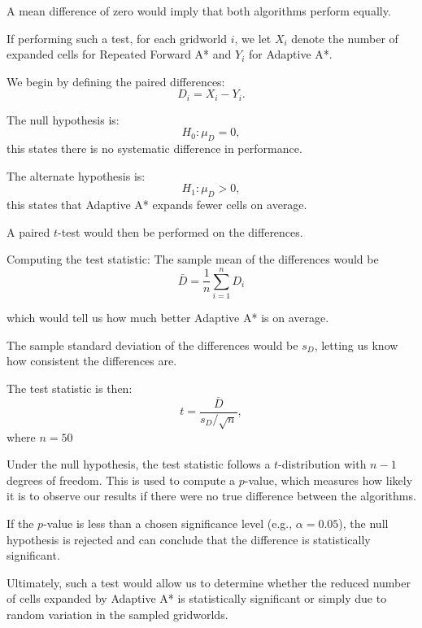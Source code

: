 \documentclass{article}
\begin{document}
A mean difference of zero would imply that both algorithms perform equally.

If performing such a test, for each gridworld $i$, we let $X_i$ denote the number of expanded cells for Repeated Forward A* and $Y_i$ for Adaptive A*.

We begin by defining the paired differences: 
\[
D_i = X_i - Y_i.
\]

The null hypothesis is:
\[
H_0: \mu_D = 0,
\]
this states there is no systematic difference in performance.

The alternate hypothesis is:
\[
H_1: \mu_D > 0,
\]
this states that Adaptive A* expands fewer cells on average.

A paired $t$-test would then be performed on the differences.

Computing the test statistic:
The sample mean of the differences would be
  \[
  \bar{D} = \frac{1}{n} \sum_{i=1}^{n} D_i
  \]

which would tell us how much better Adaptive A* is on average. 

The sample standard deviation of the differences would be $s_D$, letting us know how consistent the differences are.

The test statistic is then:
\[
t = \frac{\bar{D}}{s_D / \sqrt{n}},
\]
where $n = 50$

Under the null hypothesis, the test statistic follows a $t$-distribution with $n-1$ degrees of freedom. This is used to compute a $p$-value, which measures how likely it is to observe our results if there were no true difference between the algorithms. 

If the $p$-value is less than a chosen significance level (e.g., $\alpha = 0.05$), the null hypothesis is rejected and can conclude that the difference is statistically significant.

Ultimately, such a test would allow us to determine whether the reduced number of cells expanded by Adaptive A* is statistically significant or simply due to random variation in the sampled gridworlds.
\end{document}
